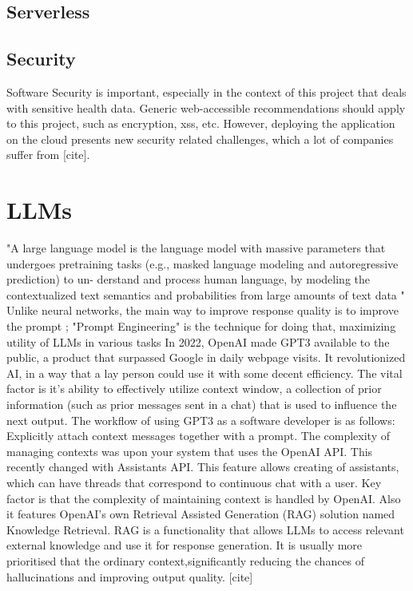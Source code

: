 \subsection{Serverless}
\subsection{Security}
Software Security is important, especially in the context of this project that deals with sensitive health data. Generic web-accessible recommendations should apply to this project, such as encryption, xss, etc. However, deploying the application on the cloud presents new security related challenges, which a lot of companies suffer from [cite]. 
\section{LLMs}
"A large language model is the language model with massive
parameters that undergoes pretraining tasks (e.g., masked
language modeling and autoregressive prediction) to un-
derstand and process human language, by modeling the
contextualized text semantics and probabilities from large
amounts of text data " \cite{Yao2023ASO}
Unlike neural networks, the main way to improve response quality is to improve the prompt \cite{Liu2021PretrainPA}; "Prompt Engineering" is the technique for doing that, maximizing utility of LLMs in various tasks \cite{zhou2023large}
 In 2022, OpenAI made GPT3 available to the public, a product that surpassed Google in daily webpage visits. It revolutionized AI, in a way that a lay person could use it with some decent efficiency. The vital factor is it's ability to effectively utilize context window, a collection of prior information (such as prior messages sent in a chat) that is used to influence the next output. The workflow of using GPT3 as a software developer is as follows: Explicitly attach context messages together with a prompt. The complexity of managing contexts was upon your system that uses the OpenAI API. This recently changed with Assistants API. This feature allows creating of assistants, which can have threads that correspond to continuous chat with a user. Key factor is that the complexity of maintaining context is handled by OpenAI. Also it features OpenAI's own Retrieval Assisted Generation (RAG) solution named Knowledge Retrieval. RAG is a functionality that allows LLMs to access relevant external knowledge and use it for response generation. It is usually more prioritised that the ordinary context,significantly reducing the chances of hallucinations and improving output quality. [cite]

